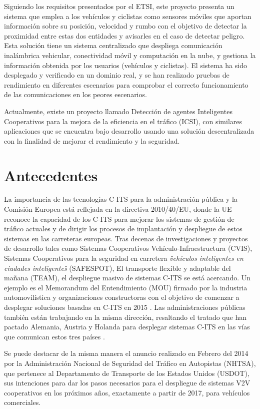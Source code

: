 Siguiendo los requisitos presentados por el ETSI, este proyecto presenta un sistema
que emplea a los vehículos y ciclistas como sensores móviles que aportan información
sobre su posición, velocidad y rumbo con el objetivo de detectar la proximidad entre
estas dos entidades y avisarles en el caso de detectar peligro. Esta solución tiene un
sistema centralizado que despliega comunicación inalámbrica vehicular, conectividad
móvil y computación en la nube, y gestiona la información obtenida por los usuarios
(vehículos y ciclistas). El sistema ha sido desplegado y verificado en un dominio real,
y se han realizado pruebas de rendimiento en diferentes escenarios para comprobar el
correcto funcionamiento de las comunicaciones en los peores escenarios.

Actualmente, existe un proyecto llamado Detección de agentes Inteligentes Cooperativos
para la mejora de la eficiencia en el tráfico (ICSI), con similares aplicaciones que
se encuentra bajo desarrollo usando una solución descentralizada con la finalidad de
mejorar el rendimiento y la seguridad.

\section{Antecedentes}\label{section:antecedentes}
La importancia de las tecnologías C-ITS para la administración pública y la Comisión
Europea está reflejada en la directiva 2010/40/EU, donde la UE reconoce la capacidad
de los C-ITS para mejorar los sistemas de gestión de tráfico actuales y de dirigir
los procesos de implantación y despliegue de estos sistemas en las carreteras
europeas. Tras decenas de investigaciones y proyectos de desarrollo tales como
Sistemas Cooperativos Vehículo-Infraestructura (CVIS), Sistemas Cooperativos para la
seguridad en carretera \emph{\"vehículos inteligentes en ciudades inteligentes\"}
(SAFESPOT), El transporte flexible y adaptable del mañana (TEAM), el despliegue
masivo de sistemas C-ITS se está acercando. Un ejemplo es el Memorandum del
Entendimiento (MOU) firmado por la industria automovilística y organizaciones
constructoras con el objetivo de comenzar a desplegar soluciones basadas en C-ITS en
2015 \cite{4}. Las administraciones públicas también están trabajando en la misma dirección,
resaltando el tratado que han pactado Alemania, Austria y Holanda para desplegar sistemas
C-ITS en las vías que comunican estos tres países \cite{5}.

Se puede destacar de la misma manera el anuncio realizado en Febrero del 2014 por la
Administración Nacional de Seguridad del Tráfico en Autopistas (NHTSA), que pertenece
al Departamento de Transporte de los Estados Unidos (USDOT), sus intenciones para dar
los pasos necesarios para el despliegue de sistemas V2V cooperativos en los próximos
años, exactamente a partir de 2017, para vehículos comerciales.
